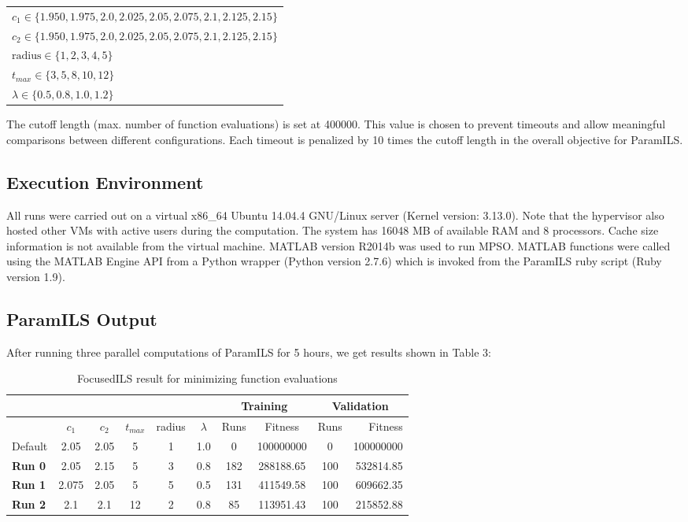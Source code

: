 \begin{center}
\begin{tabular}{l}
$c_1 \in \{1.950, 1.975, 2.0, 2.025, 2.05, 2.075, 2.1, 2.125, 2.15\}$ \\
$c_2 \in \{1.950, 1.975, 2.0, 2.025, 2.05, 2.075, 2.1, 2.125, 2.15\}$ \\
$\text{radius} \in \{1, 2, 3, 4, 5\}$ \\
$t_{max} \in \{3, 5, 8, 10, 12\}$ \\
$\lambda \in \{0.5, 0.8, 1.0, 1.2\}$ \\
\end{tabular}
\end{center}

The cutoff length (max. number of function evaluations) is set at 400000. This value is chosen to prevent timeouts and allow meaningful comparisons between different configurations. Each timeout is penalized by 10 times the cutoff length in the overall objective for ParamILS. 

\subsection{Execution Environment}

All runs were carried out on a virtual x86\_64 Ubuntu 14.04.4 GNU/Linux server (Kernel version: 3.13.0). Note that the hypervisor also hosted other VMs with active users during the computation. The system has 16048 MB of available RAM and 8 processors. Cache size information is not available from the virtual machine. MATLAB version R2014b was used to run MPSO. MATLAB functions were called using the MATLAB Engine API from a Python wrapper (Python version 2.7.6) which is invoked from the ParamILS ruby script (Ruby version 1.9).

\subsection{ParamILS Output}

After running three parallel computations of ParamILS for 5 hours, we get results shown in Table 3: 

\begin{center}
\begin{table}[h!]
\begin{tabular}{l*{8}{c}r}
& & & & & & \multicolumn{2}{c}{\textbf{Training}} & \multicolumn{2}{c}{\textbf{Validation}}\\
\hline
& $c_1$ & $c_2$ & $t_{max}$ & radius & $\lambda$ & Runs & Fitness & Runs & Fitness\\
\hline
Default & 2.05 & 2.05 & 5 & 1 & 1.0 & 0 & 100000000 & 0 & 100000000 \\
\textbf{Run 0} & 2.05 & 2.15 & 5 & 3 & 0.8 & 182 & 288188.65 & 100 & 532814.85 \\
\textbf{Run 1} & 2.075 & 2.05 & 5 & 5 & 0.5 & 131 & 411549.58 & 100 & 609662.35 \\
\textbf{Run 2} & 2.1 & 2.1 & 12 & 2 & 0.8 & 85 & 113951.43 & 100 & 215852.88
\end{tabular}
\caption{FocusedILS result for minimizing function evaluations}
\label{tbl:Table 3}
\end{table}
\end{center}

